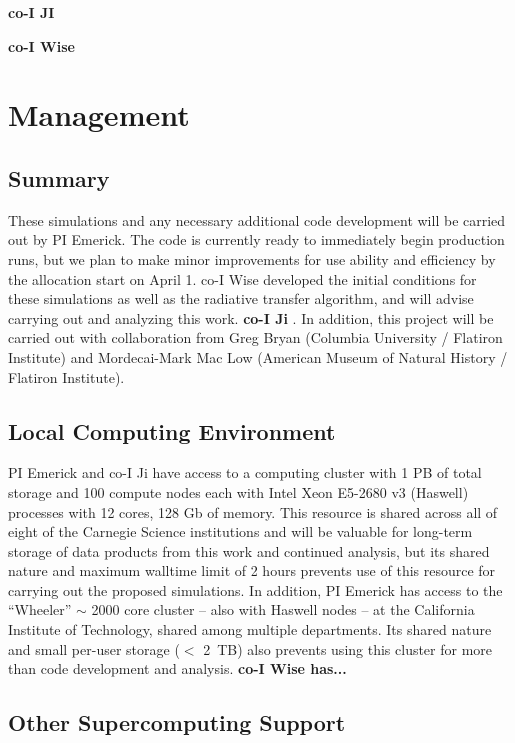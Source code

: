 \documentclass[12pt]{article} %
\begin{document}
\textbf{co-I JI}

\textbf{co-I Wise}

\section{Management}
\subsection{Summary}

These simulations and any necessary additional code development will be carried out by PI Emerick. The code is currently ready to immediately begin production runs, but we plan to make minor improvements for use ability and efficiency by the allocation start on April 1. co-I Wise developed the initial conditions for these simulations as well as the radiative transfer algorithm, and will advise carrying out and analyzing this work. \textbf{co-I Ji }. In addition, this project will be carried out with collaboration from Greg Bryan (Columbia University / Flatiron Institute) and Mordecai-Mark Mac Low (American Museum of Natural History / Flatiron Institute).

\subsection{Local Computing Environment}

PI Emerick and co-I Ji have access to a computing cluster with 1 PB of total storage and 100 compute nodes each with Intel Xeon E5-2680 v3 (Haswell) processes with 12 cores, 128 Gb of memory. This resource is shared across all of eight of the Carnegie Science institutions and will be valuable for long-term storage of data products from this work and continued analysis, but its shared nature and maximum walltime limit of 2 hours prevents use of this resource for carrying out the proposed simulations. In addition, PI Emerick has access to the ``Wheeler'' $\sim$ 2000 core cluster -- also with Haswell nodes -- at the California Institute of Technology, shared among multiple departments. Its shared nature and small per-user storage ($<$ 2~TB) also prevents using this cluster for more than code development and analysis. \textbf{co-I Wise has...}

\subsection{Other Supercomputing Support}
\end{document}
